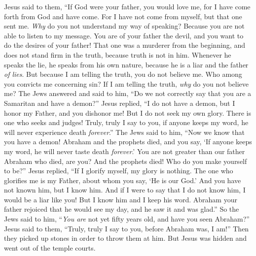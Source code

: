 \begin{biblechapter}
\verse Jesus said to them, “If God were your father, you would love me, for I have come forth from God and have come. For I have not come from myself, but that one sent me.
\verse \textit{Why} do you not understand my way of speaking? Because you are not able to listen to my message.
\verse You are of your father the devil, and you want to do the desires of your father! That one was a murderer from the beginning, and does not stand firm in the truth, because truth is not in him. Whenever he speaks the lie, he speaks from his own nature, because he is a liar and the father \textit{of lies}.
\verse But because I am telling the truth, you do not believe me.
\verse Who among you convicts me concerning sin? If I am telling the truth, \textit{why} do you not believe me?
\verse The Jews answered and said to him, “Do we not correctly say that you are a Samaritan and have a demon?”
\verse Jesus replied, “I do not have a demon, but I honor my Father, and you dishonor me!
\verse But I do not seek my own glory. There is one who seeks and judges!
\verse Truly, truly I say to you, if anyone keeps my word, he will never experience death \textit{forever}.”
\verse The Jews said to him, “Now we know that you have a demon! Abraham and the prophets died, and you say, ‘If anyone keeps my word, he will never taste death \textit{forever}.’
\verse You are not greater than our father Abraham who died, are you? And the prophets died! Who do you make yourself to be?”
\verse Jesus replied, “If I glorify myself, my glory is nothing. The one who glorifies me is my Father, about whom you say, ‘He is our God.’
\verse And you have not known him, but I know him. And if I were to say that I do not know him, I would be a liar like you! But I know him and I keep his word.
\verse Abraham your father rejoiced that he would see my day, and he saw it and was glad.”
\verse So the Jews said to him, “\textit{You are} not yet fifty years old, and have you seen Abraham?”
\verse Jesus said to them, “Truly, truly I say to you, before Abraham was, I am!”
\verse Then they picked up stones in order to throw them at him. But Jesus was hidden and went out of the temple courts.
\end{biblechapter}

